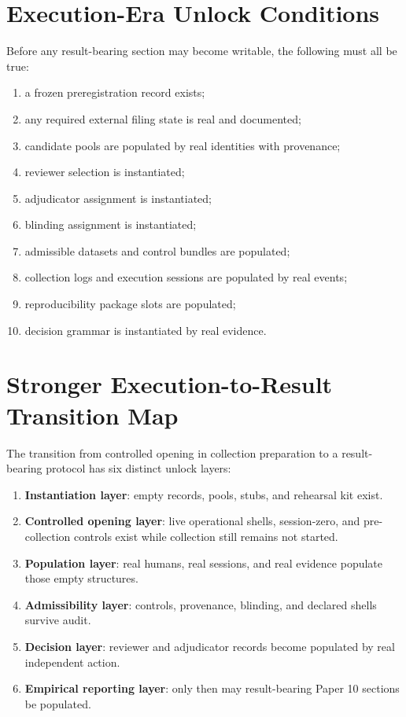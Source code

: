 \documentclass[11pt,a4paper]{article}
\begin{document}
\section{Execution-Era Unlock Conditions}

Before any result-bearing section may become writable, the following must all be
true:

\begin{enumerate}
\item a frozen preregistration record exists;
\item any required external filing state is real and documented;
\item candidate pools are populated by real identities with provenance;
\item reviewer selection is instantiated;
\item adjudicator assignment is instantiated;
\item blinding assignment is instantiated;
\item admissible datasets and control bundles are populated;
\item collection logs and execution sessions are populated by real events;
\item reproducibility package slots are populated;
\item decision grammar is instantiated by real evidence.
\end{enumerate}

\section{Stronger Execution-to-Result Transition Map}

The transition from controlled opening in collection preparation to a result-bearing protocol
has six distinct unlock layers:

\begin{enumerate}
\item \textbf{Instantiation layer}: empty records, pools, stubs, and rehearsal kit exist.
\item \textbf{Controlled opening layer}: live operational shells, session-zero, and pre-collection controls exist while collection still remains not started.
\item \textbf{Population layer}: real humans, real sessions, and real evidence populate those empty structures.
\item \textbf{Admissibility layer}: controls, provenance, blinding, and declared shells survive audit.
\item \textbf{Decision layer}: reviewer and adjudicator records become populated by real independent action.
\item \textbf{Empirical reporting layer}: only then may result-bearing Paper 10 sections be populated.
\end{enumerate}
\end{document}
